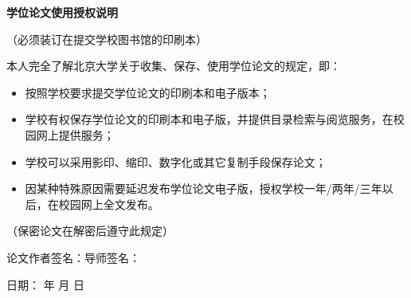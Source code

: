 \documentclass[UTF8,openany,AutoFakeBold,AutoFakeSlant,cs4size]{ctexbook}
\begin{document}
\quad

\begin{center}
\songti \bfseries {}
学位论文使用授权说明
\end{center}
\vspace*{-0.4in}
\begin{center}
\songti \fontsize{9}{9}
（必须装订在提交学校图书馆的印刷本）
\end{center}

{
\songti
{
本人完全了解北京大学关于收集、保存、使用学位论文的规定，即：
\renewcommand{\labelitemi}{●}
\begin{itemize}
    \setlength\itemsep{0.0in}
    \item \;\;按照学校要求提交学位论文的印刷本和电子版本；
    \item \;\;学校有权保存学位论文的印刷本和电子版，并提供目录检索与阅览服务，在校园网上提供服务；
    \item \;\;学校可以采用影印、缩印、数字化或其它复制手段保存论文；
    \item \;\;因某种特殊原因需要延迟发布学位论文电子版，授权学校{}一年/{}两年/{}三年以后，在校园网上全文发布。
\end{itemize}
}

}

\quad

{\songti
\hspace*{0.2\linewidth} （保密论文在解密后遵守此规定）
}

\quad


\quad


\quad


{
\songti
\hspace*{0.22\linewidth} 论文作者签名：\quad\quad\quad\quad\quad 导师签名：

\hspace*{0.3\linewidth} 日期：\quad\quad\; 年\quad \; 月\quad \; 日
}

{
	\fancyhf{}
	\fancyfoot[CO,CE]{~\thepage~}
	\renewcommand{\headrulewidth}{0.7pt}
	\renewcommand{\footrulewidth}{0pt}
}
\fancyhf{}
\fancyfoot[CO,CE]{~\thepage~}
\renewcommand{\headrulewidth}{0.7pt}
\renewcommand{\footrulewidth}{0pt}
\clearpage
\end{document}
